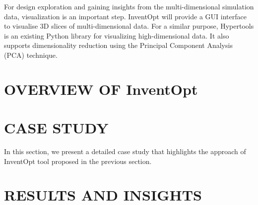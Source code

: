 \documentclass[a4paper,twoside]{article}
\begin{document}
%
For design exploration and gaining insights from the multi-dimensional simulation data, visualization is an important step. InventOpt will provide a GUI interface to visualise 3D slices of multi-dimensional data. For a similar purpose, Hypertools \cite{Hypertools} is an existing Python library for visualizing high-dimensional data. It also supports dimensionality reduction using the Principal Component Analysis (PCA) technique. 

 
\section{\uppercase{Overview of} InventOpt}
\label{sec:proposedtool}


\section{\uppercase{Case Study}}
\label{sec:casestudy}
In this section, we present a detailed case study that highlights the approach of InventOpt tool proposed in the previous section. 


\section{\uppercase{Results and Insights}}
\label{sec:results}


 
{\small }
\end{document}
